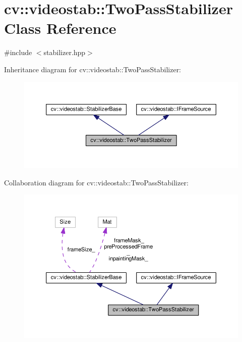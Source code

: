 \hypertarget{classcv_1_1videostab_1_1TwoPassStabilizer}{\section{cv\-:\-:videostab\-:\-:Two\-Pass\-Stabilizer Class Reference}
\label{classcv_1_1videostab_1_1TwoPassStabilizer}
}


{\ttfamily \#include $<$stabilizer.\-hpp$>$}



Inheritance diagram for cv\-:\-:videostab\-:\-:Two\-Pass\-Stabilizer\-:\nopagebreak
\begin{figure}[H]
\begin{center}
\leavevmode
\includegraphics[width=350pt]{classcv_1_1videostab_1_1TwoPassStabilizer__inherit__graph}
\end{center}
\end{figure}


Collaboration diagram for cv\-:\-:videostab\-:\-:Two\-Pass\-Stabilizer\-:\nopagebreak
\begin{figure}[H]
\begin{center}
\leavevmode
\includegraphics[width=350pt]{classcv_1_1videostab_1_1TwoPassStabilizer__coll__graph}
\end{center}
\end{figure}
